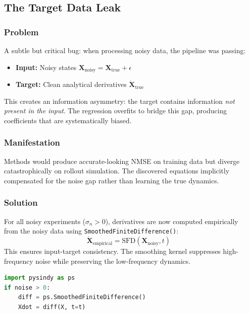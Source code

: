 \subsection{The Target Data Leak}
\label{sec:dataleak}

\subsubsection{Problem}
A subtle but critical bug: when processing noisy data, the pipeline was passing:
\begin{itemize}
    \item \textbf{Input:} Noisy states $\mathbf{X}_\text{noisy} = \mathbf{X}_\text{true} + \epsilon$
    \item \textbf{Target:} Clean analytical derivatives $\dot{\mathbf{X}}_\text{true}$
\end{itemize}
This creates an information asymmetry: the target contains information \textit{not present in the input}. The regression overfits to bridge this gap, producing coefficients that are systematically biased.

\subsubsection{Manifestation}
Methods would produce accurate-looking NMSE on training data but diverge catastrophically on rollout simulation. The discovered equations implicitly compensated for the noise gap rather than learning the true dynamics.

\subsubsection{Solution}
For all noisy experiments ($\sigma_n > 0$), derivatives are now computed empirically from the noisy data using \texttt{SmoothedFiniteDifference()}:
\begin{equation}
\dot{\mathbf{X}}_\text{empirical} = \text{SFD}(\mathbf{X}_\text{noisy}, t)
\end{equation}
This ensures input-target consistency. The smoothing kernel suppresses high-frequency noise while preserving the low-frequency dynamics.

\begin{lstlisting}[language=Python, caption={Noise-aware derivative computation}]
import pysindy as ps
if noise > 0:
    diff = ps.SmoothedFiniteDifference()
    Xdot = diff(X, t=t)
\end{lstlisting}

